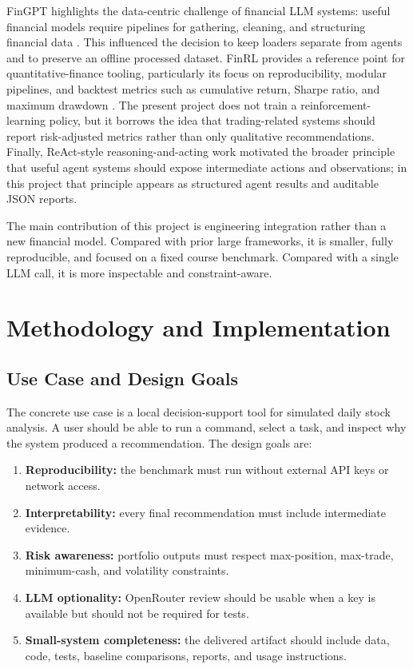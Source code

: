 \documentclass{article}
\begin{document}
FinGPT highlights the data-centric challenge of financial LLM systems: useful financial models require pipelines for gathering, cleaning, and structuring financial data \citep{yang2023fingpt}. This influenced the decision to keep loaders separate from agents and to preserve an offline processed dataset. FinRL provides a reference point for quantitative-finance tooling, particularly its focus on reproducibility, modular pipelines, and backtest metrics such as cumulative return, Sharpe ratio, and maximum drawdown \citep{liu2021finrl}. The present project does not train a reinforcement-learning policy, but it borrows the idea that trading-related systems should report risk-adjusted metrics rather than only qualitative recommendations. Finally, ReAct-style reasoning-and-acting work \citep{yao2022react} motivated the broader principle that useful agent systems should expose intermediate actions and observations; in this project that principle appears as structured agent results and auditable JSON reports.

The main contribution of this project is engineering integration rather than a new financial model. Compared with prior large frameworks, it is smaller, fully reproducible, and focused on a fixed course benchmark. Compared with a single LLM call, it is more inspectable and constraint-aware.

\section{Methodology and Implementation}
\label{sec:method}

\subsection{Use Case and Design Goals}

The concrete use case is a local decision-support tool for simulated daily stock analysis. A user should be able to run a command, select a task, and inspect why the system produced a recommendation. The design goals are:

\begin{enumerate}[leftmargin=*]
  \item \textbf{Reproducibility:} the benchmark must run without external API keys or network access.
  \item \textbf{Interpretability:} every final recommendation must include intermediate evidence.
  \item \textbf{Risk awareness:} portfolio outputs must respect max-position, max-trade, minimum-cash, and volatility constraints.
  \item \textbf{LLM optionality:} OpenRouter review should be usable when a key is available but should not be required for tests.
  \item \textbf{Small-system completeness:} the delivered artifact should include data, code, tests, baseline comparisons, reports, and usage instructions.
\end{enumerate}
\end{document}
